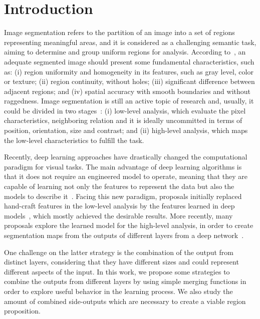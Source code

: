 \section{Introduction}
\label{sec:intro}

Image segmentation refers to the partition of an image into a set of regions representing  meaningful areas, and it is considered as a challenging semantic task, aiming to determine and group uniform regions for analysis. According to~\cite{DOMINGUEZ}, an adequate segmented image should present some fundamental characteristics, such as: (i) region uniformity and homogeneity in  its features, such as gray level, color or texture; (ii) region continuity, without holes; (iii) significant difference between adjacent regions; and (iv) spatial accuracy with smooth boundaries and without raggedness. Image segmentation is still an active topic of research and, usually, it could be divided in two stages~\cite{guigues06}: (i) low-level analysis, which evaluate the pixel characteristics, neighboring relation and it is ideally uncommitted in terms of position, orientation, size and contrast; and (ii) high-level analysis, which maps the low-level characteristics to fulfill the task.  

Recently, deep learning approaches have drastically changed the computational paradigm for visual tasks. The main advantage of deep learning algorithms is that it does not require an engineered model to operate, meaning that they are capable of learning not only the features to represent the data but also the models to describe it~\cite{goodfellow16}. Facing this new paradigm, proposals initially replaced  hand-craft features in the low-level analysis by the features learned in deep models~\cite{farabet2013,simonyan2014,lee2015}, which mostly achieved the desirable results. More recently, many proposals explore the learned model for the high-level analysis, in order to create segmentation maps from the outputs of different layers from a deep network~\cite{xie2017,cheng2016,maninis2017,liu2017}. 

One challenge on the latter strategy is the combination of the output from distinct layers, considering that they have different sizes and could represent different aspects of the input. In this work, we propose some strategies to combine the outputs from different layers by using simple merging functions in order to explore useful behavior in the learning process. We also study the amount of combined side-outputs  which are necessary to create a viable region proposition.

